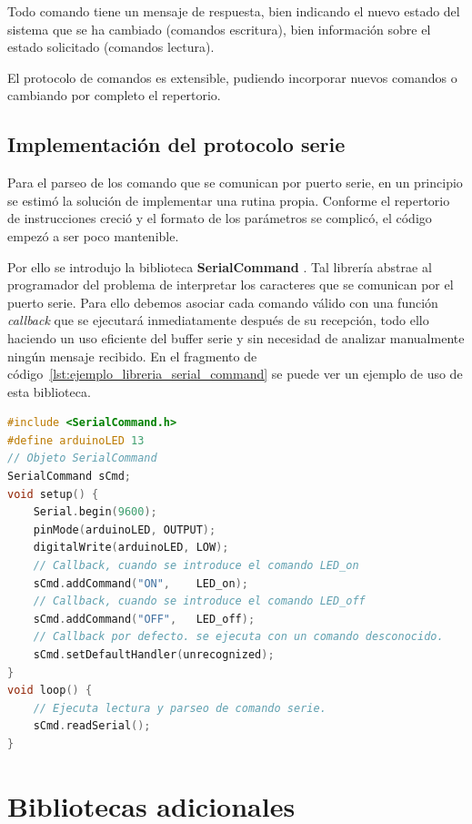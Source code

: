 Todo comando tiene un mensaje de respuesta, bien indicando el nuevo estado del sistema que se ha cambiado (comandos escritura), bien información sobre el estado solicitado  (comandos lectura).


El protocolo de comandos es extensible, pudiendo incorporar nuevos comandos o cambiando por completo el repertorio. 


\subsection{Implementación del protocolo serie}

Para el parseo de los comando que se comunican por puerto serie, en un principio se estimó la solución de implementar una rutina propia. Conforme el repertorio de instrucciones creció y el formato de los parámetros se complicó, el código empezó a ser poco mantenible.

Por ello se introdujo la biblioteca \textbf{SerialCommand} \cite{serialCommand}. Tal librería abstrae al programador del problema de interpretar los caracteres que se comunican por el puerto serie. Para ello debemos asociar cada comando válido con una función \textit{callback} que se ejecutará inmediatamente después de su recepción, todo ello haciendo un uso eficiente del buffer serie y sin necesidad de analizar manualmente ningún mensaje recibido. En el fragmento de código~\ref{lst:ejemplo_libreria_serial_command} se puede ver un ejemplo de uso de esta biblioteca.

\begin{lstlisting}[language=cpp, caption={Ejemplo de uso de la biblioteca SerialCommand},label={lst:ejemplo_libreria_serial_command}]
#include <SerialCommand.h>
#define arduinoLED 13   
// Objeto SerialCommand
SerialCommand sCmd;     
void setup() {
	Serial.begin(9600);
	pinMode(arduinoLED, OUTPUT);      
	digitalWrite(arduinoLED, LOW);   
	// Callback, cuando se introduce el comando LED_on
	sCmd.addCommand("ON",    LED_on); 
	// Callback, cuando se introduce el comando LED_off         
	sCmd.addCommand("OFF",   LED_off);   
	// Callback por defecto. se ejecuta con un comando desconocido.      
	sCmd.setDefaultHandler(unrecognized);      
}
void loop() {
    // Ejecuta lectura y parseo de comando serie.
	sCmd.readSerial();     
}

\end{lstlisting}

\section{Bibliotecas adicionales}

